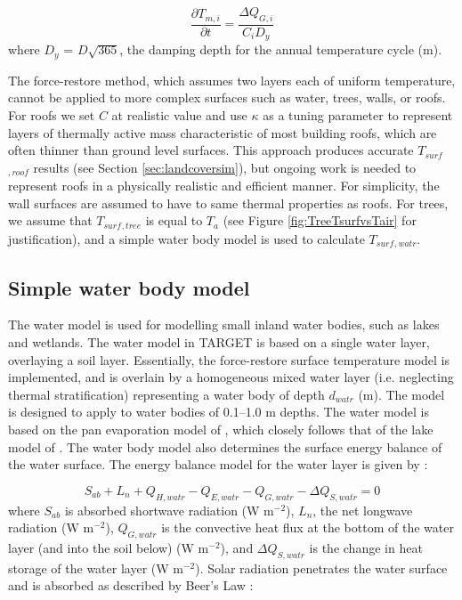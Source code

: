 \documentclass[gmd, manuscript]{copernicus}
\begin{document}
\begin{equation} 
\frac{\partial T_{m,i}}{\partial t} = \frac{\Delta \ensuremath{Q_{G,i}}}{C_{i} D_{y}}
\label{eq:tm} \end{equation} where \ensuremath{D_{y}} = $D \sqrt{365}$, the damping depth for the annual temperature cycle (m). 

The force-restore method, which assumes two layers each of uniform temperature, cannot be applied to more complex surfaces such as water, trees, walls, or roofs. For  roofs  we set \ensuremath{C} at realistic value and use \ensuremath{\kappa} as a tuning parameter to represent layers of thermally active mass characteristic of most building roofs, which are often thinner than ground level surfaces.  This approach produces accurate $T_{surf}$$_{,roof}$ results (see Section \ref{sec:landcoversim}), but ongoing work is needed to represent roofs in a physically realistic  and  efficient manner. For simplicity, the wall surfaces are assumed to have to same thermal properties as roofs. For trees, we assume that $T_{surf}$$_{,tree}$ is equal to \ensuremath{T_{a}} (see Figure \ref{fig:TreeTsurfvsTair} for justification), and a simple water body model is used to calculate $T_{surf}$$_{,watr}$.


\subsection{Simple water body model}\label{sec:simplewater}

The water model is used for modelling small inland water bodies, such as lakes and wetlands. The water model in  TARGET is based on a single water layer, overlaying a soil layer. Essentially, the force-restore surface temperature model is implemented, and is overlain by a homogeneous mixed water layer (i.e. neglecting thermal stratification) representing a water body of depth \ensuremath{d_{watr}} (m). The model is designed to apply to water bodies of 0.1--1.0 m depths. The water model is based on the pan evaporation model of \cite{MolinaMartinez2006}, which closely follows that of the lake model of \cite{Jacobs1998}. The water body model also determines the surface energy balance of the water surface. The energy balance model for the water layer is given by \cite{MolinaMartinez2006}:

\begin{equation} 
\ensuremath{S_{ab}} + \ensuremath{L_{n}} + \ensuremath{Q_{H,watr}} - \ensuremath{Q_{E,watr}} - \ensuremath{Q_{G,watr}} -\ensuremath{\Delta Q_{S,watr}} = 0
\label{eq:sab} \end{equation} where \ensuremath{S_{ab}} is absorbed shortwave radiation (W m$^{-2}$), \ensuremath{L_{n}}, the net longwave radiation (W m$^{-2}$), \ensuremath{Q_{G,watr}} is the convective heat flux at the bottom of the water layer (and into the soil below) (W m$^{-2}$), and \ensuremath{\Delta Q_{S,watr}} is the change in heat storage of the water layer (W m$^{-2}$). Solar radiation penetrates the water surface and is absorbed as described by Beer's Law \citep{MolinaMartinez2006}:
\end{document}
